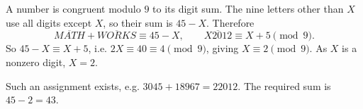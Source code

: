 A number is congruent modulo $9$ to its digit sum. The nine letters other than $X$ use all digits except $X$, so their sum is $45-X$. Therefore
\[\overline{MATH}+\overline{WORKS}\equiv 45-X,\qquad \overline{X2012}\equiv X+5\pmod9.\]
So $45-X\equiv X+5$, i.e. $2X\equiv40\equiv4\pmod9$, giving $X\equiv2\pmod9$. As $X$ is a nonzero digit, $X=2$.

Such an assignment exists, e.g. $3045+18967=22012$. The required sum is $45-2=\boxed{43}$.
